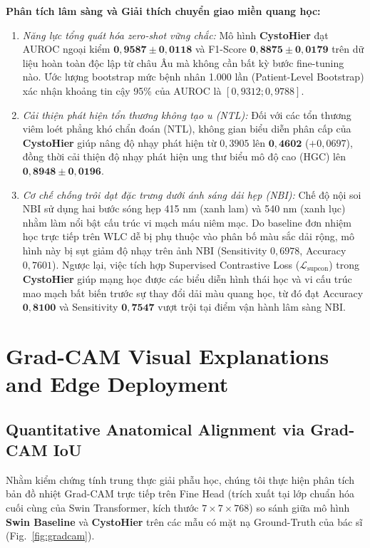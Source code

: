 \documentclass[runningheads]{llncs}
\begin{document}
\textbf{Phân tích lâm sàng và Giải thích chuyển giao miền quang học:}
\begin{enumerate}
    \item \textit{Năng lực tổng quát hóa zero-shot vững chắc:} Mô hình \textbf{CystoHier} đạt AUROC ngoại kiểm $\mathbf{0{,}9587 \pm 0{,}0118}$ và F1-Score $\mathbf{0{,}8875 \pm 0{,}0179}$ trên dữ liệu hoàn toàn độc lập từ châu Âu mà không cần bất kỳ bước fine-tuning nào. Ước lượng bootstrap mức bệnh nhân 1.000 lần (Patient-Level Bootstrap) xác nhận khoảng tin cậy 95\% của AUROC là $[0{,}9312; 0{,}9788]$.
    \item \textit{Cải thiện phát hiện tổn thương không tạo u (NTL):} Đối với các tổn thương viêm loét phẳng khó chẩn đoán (NTL), không gian biểu diễn phân cấp của \textbf{CystoHier} giúp nâng độ nhạy phát hiện từ $0{,}3905$ lên $\mathbf{0{,}4602}$ ($+0{,}0697$), đồng thời cải thiện độ nhạy phát hiện ung thư biểu mô độ cao (HGC) lên $\mathbf{0{,}8948 \pm 0{,}0196}$.
    \item \textit{Cơ chế chống trôi dạt đặc trưng dưới ánh sáng dải hẹp (NBI):} Chế độ nội soi NBI sử dụng hai bước sóng hẹp 415 nm (xanh lam) và 540 nm (xanh lục) nhằm làm nổi bật cấu trúc vi mạch máu niêm mạc. Do baseline đơn nhiệm học trực tiếp trên WLC dễ bị phụ thuộc vào phân bố màu sắc dải rộng, mô hình này bị sụt giảm độ nhạy trên ảnh NBI (Sensitivity $0{,}6978$, Accuracy $0{,}7601$). Ngược lại, việc tích hợp Supervised Contrastive Loss ($\mathcal{L}_{\text{supcon}}$) trong \textbf{CystoHier} giúp mạng học được các biểu diễn hình thái học và vi cấu trúc mao mạch bất biến trước sự thay đổi dải màu quang học, từ đó đạt Accuracy $\mathbf{0{,}8100}$ và Sensitivity $\mathbf{0{,}7547}$ vượt trội tại điểm vận hành lâm sàng NBI.
\end{enumerate}

\FloatBarrier
\section{Grad-CAM Visual Explanations and Edge Deployment}
\label{sec:explainability}

\subsection{Quantitative Anatomical Alignment via Grad-CAM IoU}
Nhằm kiểm chứng tính trung thực giải phẫu học, chúng tôi thực hiện phân tích bản đồ nhiệt Grad-CAM trực tiếp trên Fine Head (trích xuất tại lớp chuẩn hóa cuối cùng của Swin Transformer, kích thước $7 \times 7 \times 768$) so sánh giữa mô hình \textbf{Swin Baseline} và \textbf{CystoHier} trên các mẫu có mặt nạ Ground-Truth của bác sĩ (Fig.~\ref{fig:gradcam}).
\end{document}
